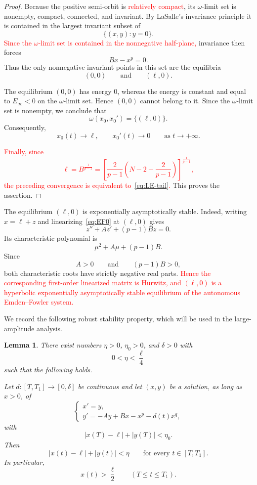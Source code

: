 \documentclass[11pt]{article}
\newtheorem{lemma}[theorem]{Lemma}
\theoremstyle{definition}
\begin{document}
\begin{proof}
Because the positive semi-orbit is \textcolor{red}{relatively compact},
its $\omega$-limit set is nonempty, compact, connected, and invariant.
By LaSalle's invariance principle it is contained in the largest
invariant subset of
\[
\{(x,y):y=0\}.
\]
\textcolor{red}{Since the $\omega$-limit set is contained in the
nonnegative half-plane,} invariance then forces
\[
Bx-x^p=0.
\]
Thus the only nonnegative invariant points in this set are the
equilibria
\[
(0,0)
\qquad\text{and}\qquad
(\ell,0).
\]

The equilibrium $(0,0)$ has energy $0$, whereas the energy is constant
and equal to $E_\infty<0$ on the $\omega$-limit set. Hence $(0,0)$
cannot belong to it. Since the $\omega$-limit set is nonempty, we
conclude that
\[
\omega(x_0,x_0')=\{(\ell,0)\}.
\]
Consequently,
\[
x_0(t)\longrightarrow\ell,
\qquad
x_0'(t)\longrightarrow0
\qquad
\text{as }t\to+\infty.
\]

\textcolor{red}{Finally, since
\[
\ell=B^{\frac1{p-1}}
=
\left[
\frac2{p-1}
\left(
N-2-\frac2{p-1}
\right)
\right]^{\frac1{p-1}},
\]
the preceding convergence is equivalent to~\eqref{eq:LE-tail}.}
This proves the assertion.
\end{proof}

The equilibrium $(\ell,0)$ is exponentially asymptotically stable.
Indeed, writing $x=\ell+z$ and linearizing~\eqref{eq:EF0} at
$(\ell,0)$ gives
\[
z''
+Az'
+(p-1)Bz
=0.
\]
Its characteristic polynomial is
\[
\mu^2+A\mu+(p-1)B.
\]
Since
\[
A>0
\qquad\text{and}\qquad
(p-1)B>0,
\]
both characteristic roots have strictly negative real parts.
\textcolor{red}{Hence the corresponding first-order linearized matrix
is Hurwitz, and $(\ell,0)$ is a hyperbolic exponentially
asymptotically stable equilibrium of the autonomous
Emden--Fowler system.}

We record the following robust stability property, which will be
used in the large-amplitude analysis.

\begin{lemma}
\label{lem:robust}
There exist numbers $\eta>0$, $\eta_0>0$, and $\delta>0$ with
\[
0<\eta<\frac{\ell}{4}
\]
such that the following holds.

Let $d:[T,T_1]\to[0,\delta]$ be continuous and let $(x,y)$ be a
solution, as long as $x>0$, of
\begin{equation}
\label{eq:perturbed-system}
\begin{cases}
x'=y,\\
y'=-Ay+Bx-x^p-d(t)x^q,
\end{cases}
\end{equation}
with
\[
|x(T)-\ell|+|y(T)|<\eta_0.
\]
Then
\[
|x(t)-\ell|+|y(t)|<\eta
\qquad
\text{for every }t\in[T,T_1].
\]
In particular,
\[
x(t)>\frac{\ell}{2}
\qquad
(T\leq t\leq T_1).
\]
\end{lemma}
\end{document}
